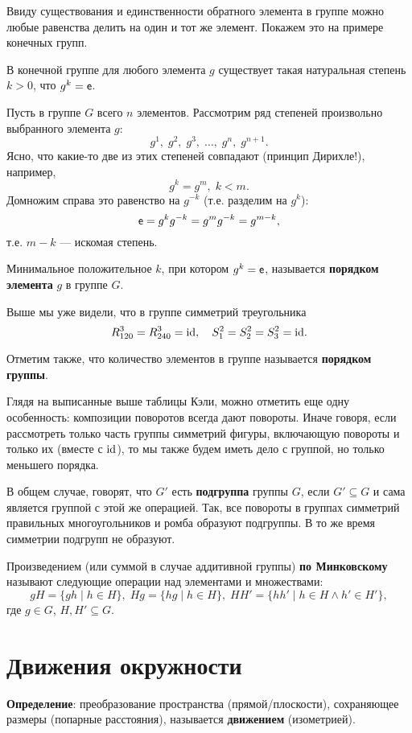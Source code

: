 Ввиду существования и единственности обратного элемента в группе можно любые равенства делить на один и тот же элемент. Покажем это на примере конечных групп.
\begin{thrm}
В конечной группе для любого элемента $g$ существует такая натуральная степень $k>0$, что $g^k=\mathsf e$.
\end{thrm}
\pf
Пусть в группе $G$ всего $n$ элементов. Рассмотрим ряд степеней произвольно выбранного элемента $g$:
$$
g^1,\;g^2,\;g^3,\;\dots,\;g^n,\;g^{n+1}.
$$
Ясно, что какие-то две из этих степеней совпадают (принцип Дирихле!), например,
$$
g^k=g^m,\;k<m.
$$
Домножим справа это равенство на $g^{-k}$ (т.е. разделим на $g^k$):
$$
\mathsf e=g^kg^{-k}=g^mg^{-k}=g^{m-k},
$$
т.е. $m-k$ --- искомая степень.
\epf

Минимальное положительное $k$, при котором $g^k=\mathsf e$, называется \textbf{порядком элемента} $g$ в группе $G$.

Выше мы уже видели, что в группе симметрий треугольника
$$
R_{120}^3=R_{240}^3=\mathrm{id},\quad S_1^2=S_2^2=S_3^2=\mathrm{id}.
$$

Отметим также, что количество элементов в группе называется \textbf{порядком группы}.

Глядя на выписанные выше таблицы Кэли, можно отметить еще одну особенность: композиции поворотов всегда дают повороты. Иначе говоря, если рассмотреть только часть группы симметрий фигуры, включающую повороты и только их (вместе с $\mathrm{id}$), то мы также будем иметь дело с группой, но только меньшего порядка.

В общем случае, говорят, что $G'$ есть \textbf{подгруппа} группы $G$, если $G'\subseteq G$ и сама является группой с этой же операцией. Так, все повороты в группах симметрий правильных многоугольников и ромба образуют подгруппы. В то же время симметрии подгрупп не образуют.

Произведением (или суммой в случае аддитивной группы) \textbf{по Минковскому} называют следующие операции над элементами и множествами:
$$
gH=\{gh\;|\;h\in H\},\;Hg=\{hg\;|\;h\in H\},\;HH'=\{hh'\;|\;h\in H\land h'\in H'\},
$$
где $g\in G$, $H,H'\subseteq G$.




\section{Движения окружности}
 

\textbf{Определение}: преобразование пространства (прямой/плоскости), сохраняющее размеры (попарные расстояния), называется \textbf{движением} (изометрией).

